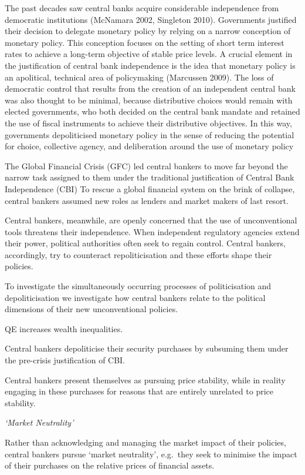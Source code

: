 \documentclass[
]{book}
\begin{document}
The past decades saw central banks acquire considerable independence from democratic institutions
(McNamara 2002, Singleton 2010). Governments justified their decision to delegate monetary policy
by relying on a narrow conception of monetary policy. This conception focuses on the setting of short
term interest rates to achieve a long-term objective of stable price levels. A crucial element in the
justification of central bank independence is the idea that monetary policy is an apolitical, technical
area of policymaking (Marcussen 2009). The loss of democratic control that results from the creation
of an independent central bank was also thought to be minimal, because distributive choices would
remain with elected governments, who both decided on the central bank mandate and retained the
use of fiscal instruments to achieve their distributive objectives. In this way, governments depoliticised
monetary policy in the sense of reducing the potential for choice, collective agency, and deliberation
around the use of monetary policy

The Global Financial Crisis (GFC) led central bankers to move far beyond the narrow task assigned
to them under the traditional justification of Central Bank Independence (CBI)
To rescue a global financial system on the brink of collapse, central bankers assumed new roles as lenders and market makers of last resort.

Central bankers, meanwhile, are openly concerned that the use of unconventional tools threatens
their independence.
When independent regulatory agencies extend their power, political authorities often seek to regain
control.
Central bankers, accordingly, try to counteract repoliticisation and these efforts
shape their policies.

To investigate the simultaneously occurring processes of politicisation and depoliticisation
we investigate how central bankers relate to the political dimensions of their
new unconventional policies.

QE increases wealth inequalities.

Central bankers depoliticise their security purchases by subsuming
them under the pre-crisis justification of CBI.

Central bankers present themselves as pursuing price stability,
while in reality engaging in these purchases for reasons that are entirely unrelated to price stability.

\emph{`Market Neutrality'}

Rather than acknowledging and
managing the market impact of their policies, central bankers pursue `market neutrality', e.g.~they
seek to minimise the impact of their purchases on the relative prices of financial assets.
\end{document}
